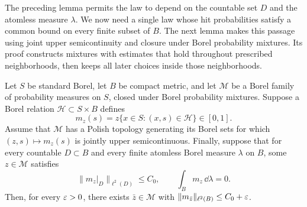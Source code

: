 The preceding lemma permits the law to depend on the countable set $D$
and the atomless measure $\lambda$.  We now need a single law whose hit
probabilities satisfy a common bound on every finite subset of $B$.
The next lemma makes this passage using joint upper semicontinuity and
closure under Borel probability mixtures.  Its proof constructs mixtures
with estimates that hold throughout prescribed neighborhoods, then keeps
all later choices inside those neighborhoods.

\begin{lemma}\label{lem:law-fusion}
Let \(S\) be standard Borel, let \(B\) be compact metric, and let
\(\mathcal M\) be a Borel family of probability measures on \(S\), closed
under Borel probability mixtures.  Suppose a Borel relation
\(\mathcal H\subset S\times B\) defines
\[
 m_z(s)=z\{x\in S:(x,s)\in\mathcal H\}\in[0,1].
\]
Assume that \(\mathcal M\) has a Polish topology generating its Borel sets
for which \((z,s)\mapsto m_z(s)\) is jointly upper semicontinuous.  Finally,
suppose that for every countable \(D\subset B\) and every finite atomless
Borel measure \(\lambda\) on \(B\), some \(z\in\mathcal M\) satisfies
\begin{equation}\label{eq:fusion-countable-tests}
 \|m_z|_D\|_{\ell^2(D)}\le C_0,
 \qquad \int_Bm_z\,\dd\lambda=0.
\end{equation}
Then, for every \(\varepsilon>0\), there exists \(\bar z\in\mathcal M\) with
\(\|m_{\bar z}\|_{\ell^2(B)}\le C_0+\varepsilon\).
\end{lemma}

